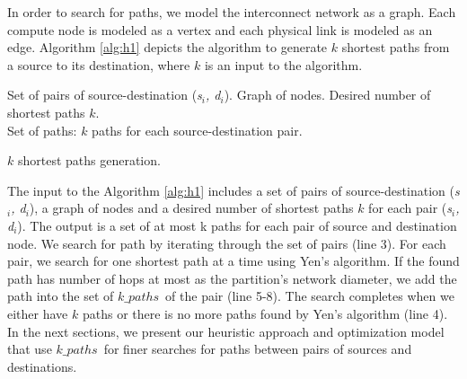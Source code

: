 In order to search for paths, we model the interconnect network as a graph. Each compute node is modeled as a vertex and each physical link is modeled as an edge. Algorithm \ref{alg:h1} depicts the algorithm to generate $k$ shortest paths from a source to its destination, where $k$ is an input to the algorithm.
\begin{algorithm}[!htbp]
 Set of pairs of source-destination (\textit{s$_i$, d$_i$}). Graph of nodes. Desired number of shortest paths $k$.\\
 Set of paths: $k$ paths for each source-destination pair.\\
\caption{$k$ shortest paths generation.}
\label{alg:h1}
\end{algorithm}

The input to the Algorithm \ref{alg:h1} includes a set of pairs of source-destination (\textit{s$_i$, d$_i$}), a graph of nodes and a desired number of shortest paths $k$ for each pair (\textit{s$_i$, d$_i$}). The output is a set of at most k paths for each pair of source and destination node. We search for path by iterating through the set of pairs (line 3). For each pair, we search for one shortest path at a time using Yen's algorithm. If the found path has number of hops at most as the partition's network diameter, we add the path into the set of $k\_paths$\ of the pair (line 5-8). The search completes when we either have $k$ paths or there is no more paths found by Yen's algorithm (line 4). In the next sections, we present our heuristic approach and optimization model that use $k\_paths$\ for finer searches for paths between pairs of sources and destinations.



